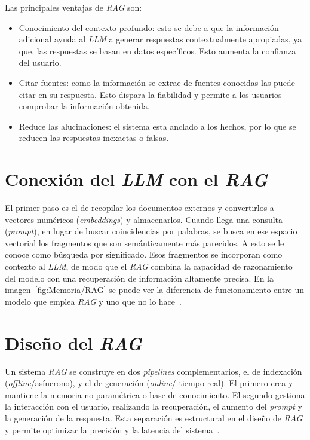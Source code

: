 Las principales ventajas de \textit{RAG} son:
\begin{itemize}
\tightlist
	\item Conocimiento del contexto profundo: esto se debe a que la información adicional ayuda al \textit{LLM} a generar respuestas contextualmente apropiadas, ya que, las respuestas se basan en datos específicos. Esto aumenta la confianza del usuario.
	\item Citar fuentes: como la información se extrae de fuentes conocidas las puede citar en su respuesta. Esto dispara la fiabilidad y permite a los usuarios comprobar la información obtenida.
	\item Reduce las alucinaciones: el sistema esta anclado a los hechos, por lo que se reducen las respuestas inexactas o falsas. 
\end{itemize}

\section{Conexión del \textit{LLM} con el \textit{RAG}}
El primer paso es el de recopilar los documentos externos y convertirlos a vectores numéricos (\textit{embeddings}) y almacenarlos. Cuando llega una consulta (\textit{prompt}), en lugar de buscar coincidencias por palabras, se busca en ese espacio vectorial los fragmentos que son semánticamente más parecidos. A esto se le conoce como búsqueda por significado. Esos fragmentos se incorporan como contexto al \textit{LLM}, de modo que el \textit{RAG} combina la capacidad de razonamiento del modelo con una recuperación de información altamente precisa. En la imagen~\ref{fig:Memoria/RAG} se puede ver la diferencia de funcionamiento entre un modelo que emplea \textit{RAG} y uno que no lo hace~\cite{RAG:image}.


\section{Diseño del \textit{RAG}}
Un sistema \textit{RAG} se construye en dos \textit{pipelines} complementarios, el de indexación (\textit{offline}/asíncrono), y el de generación (\textit{online}/ tiempo real). El primero crea y mantiene la memoria no paramétrica o base de conocimiento. El segundo gestiona la interacción con el usuario, realizando la recuperación, el aumento del \textit{prompt} y la generación de la respuesta. Esta separación es estructural en el diseño de \textit{RAG} y permite optimizar la precisión y la latencia del sistema~\cite{book:RAG_SimpleGuide}.

